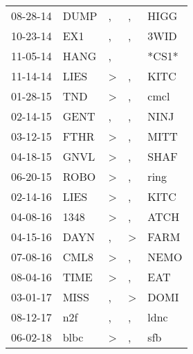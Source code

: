 \begin{supertabular}{lllll}
 08-28-14 &   DUMP &             , &             , &   HIGG \\
 10-23-14 &    EX1 &             , &             , &   3WID \\
 11-05-14 &   HANG &             , &               &  *CS1* \\
 11-14-14 &   LIES &  \textgreater &             , &   KITC \\
 01-28-15 &    TND &  \textgreater &             , &   cmcl \\
 02-14-15 &   GENT &             , &             , &   NINJ \\
 03-12-15 &   FTHR &  \textgreater &             , &   MITT \\
 04-18-15 &   GNVL &  \textgreater &             , &   SHAF \\
 06-20-15 &   ROBO &  \textgreater &             , &   ring \\
 02-14-16 &   LIES &  \textgreater &             , &   KITC \\
 04-08-16 &   1348 &  \textgreater &             , &   ATCH \\
 04-15-16 &   DAYN &             , &  \textgreater &   FARM \\
 07-08-16 &   CML8 &  \textgreater &             , &   NEMO \\
 08-04-16 &   TIME &  \textgreater &             , &    EAT \\
 03-01-17 &   MISS &             , &  \textgreater &   DOMI \\
 08-12-17 &    n2f &             , &             , &   ldnc \\
 06-02-18 &   blbc &  \textgreater &             , &    sfb \\
\end{supertabular}
